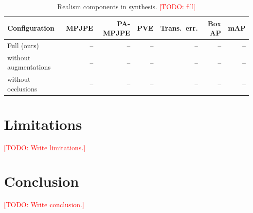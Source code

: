 \documentclass{egpubl}
\newcommand{\todo}[1]{\textcolor{red}{[TODO: #1]}}
\begin{document}
\begin{table}[t]
  \centering
  \caption{Realism components in synthesis. \todo{fill}}
  \label{tab:abl_realism}
  \begin{tabular}{@{}lrrrrrr@{}}
    \toprule
    Configuration & MPJPE & PA-MPJPE & PVE & Trans.\ err. & Box AP & mAP \\
    \midrule
    Full (ours)                        & -- & -- & -- & -- & -- & -- \\
    without augmentations              & -- & -- & -- & -- & -- & -- \\
    without occlusions                 & -- & -- & -- & -- & -- & -- \\
    \bottomrule
  \end{tabular}
\end{table}

\section{Limitations}
\label{sec:limitations}
\todo{Write limitations.}

\section{Conclusion}
\label{sec:conclusion}
\todo{Write conclusion.}



\end{document}
